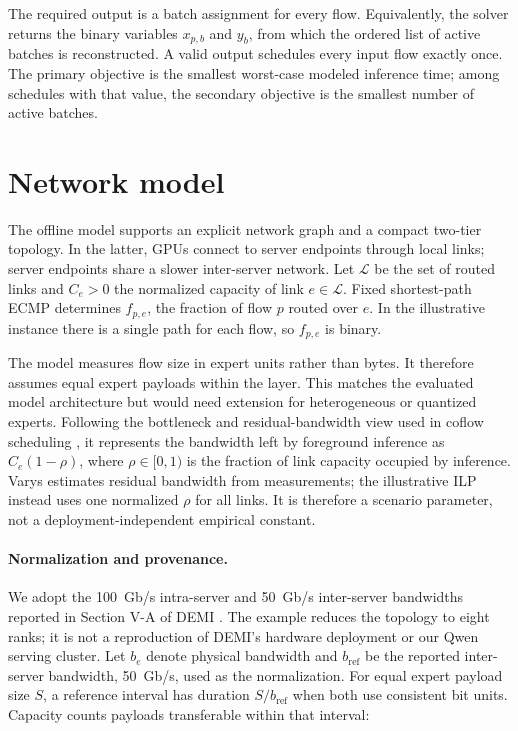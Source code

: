 The required output is a batch assignment for every flow. Equivalently, the
solver returns the binary variables $x_{p,b}$ and $y_b$, from which the ordered
list of active batches is reconstructed. A valid output schedules every input
flow exactly once. The primary objective is the smallest worst-case modeled
inference time; among schedules with that value, the secondary objective is the
smallest number of active batches.

\section{Network model}

The offline model supports an explicit network graph and a compact two-tier
topology. In the latter, GPUs connect to server endpoints through local links;
server endpoints share a slower inter-server network. Let $\mathcal{L}$ be the
set of routed links and $C_e>0$ the normalized capacity of link $e\in\mathcal{L}$. Fixed
shortest-path ECMP determines $f_{p,e}$, the fraction of flow $p$ routed over
$e$. In the illustrative instance there is a single path for each flow, so
$f_{p,e}$ is binary.

The model measures flow size in expert units rather than bytes. It therefore
assumes equal expert payloads within the layer. This matches the evaluated
model architecture but would need extension for heterogeneous or quantized
experts. Following the bottleneck and residual-bandwidth view used in coflow
scheduling \cite{chowdhury2014varys}, it represents the bandwidth left by
foreground inference as $C_e(1-\rho)$, where $\rho\in[0,1)$ is the fraction of
link capacity occupied by inference. Varys estimates residual bandwidth from
measurements; the illustrative ILP instead uses one normalized $\rho$ for all
links. It is therefore a scenario parameter, not a deployment-independent
empirical constant.

\paragraph{Normalization and provenance.}
We adopt the 100~Gb/s intra-server and 50~Gb/s inter-server bandwidths reported
in Section V-A of DEMI \cite{zhang2025demi}. The example reduces the topology
to eight ranks; it is not a reproduction of DEMI's hardware deployment or our
Qwen serving cluster. Let $b_e$ denote physical bandwidth and $b_{\mathrm{ref}}$
be the reported inter-server bandwidth, 50~Gb/s, used as the normalization.
For equal expert payload size $S$, a
reference interval has duration $S/b_{\mathrm{ref}}$ when both use consistent
bit units. Capacity counts payloads transferable within that interval:

